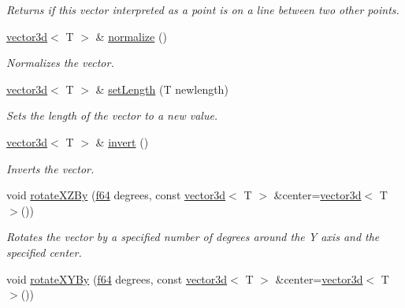 \begin{DoxyCompactItemize}
\begin{DoxyCompactList}\small\item\em Returns if this vector interpreted as a point is on a line between two other points. \end{DoxyCompactList}\item 
\hyperlink{classirr_1_1core_1_1vector3d}{vector3d}$<$ T $>$ \& \hyperlink{classirr_1_1core_1_1vector3d_a84a1861464ef70e6965c146732103c09}{normalize} ()
\begin{DoxyCompactList}\small\item\em Normalizes the vector. \end{DoxyCompactList}\item 
\mbox{\label{classirr_1_1core_1_1vector3d_ae593448ac63803b3d254b0e6c7600f28}} 
\hyperlink{classirr_1_1core_1_1vector3d}{vector3d}$<$ T $>$ \& \hyperlink{classirr_1_1core_1_1vector3d_ae593448ac63803b3d254b0e6c7600f28}{set\+Length} (T newlength)
\begin{DoxyCompactList}\small\item\em Sets the length of the vector to a new value. \end{DoxyCompactList}\item 
\mbox{\label{classirr_1_1core_1_1vector3d_a55a10e03bc09f87b95fc81ea0d508722}} 
\hyperlink{classirr_1_1core_1_1vector3d}{vector3d}$<$ T $>$ \& \hyperlink{classirr_1_1core_1_1vector3d_a55a10e03bc09f87b95fc81ea0d508722}{invert} ()
\begin{DoxyCompactList}\small\item\em Inverts the vector. \end{DoxyCompactList}\item 
void \hyperlink{classirr_1_1core_1_1vector3d_a621fbddb42814edd3d14410252cf7b7a}{rotate\+X\+Z\+By} (\hyperlink{namespaceirr_a1325b02603ad449f92c68fc640af9b28}{f64} degrees, const \hyperlink{classirr_1_1core_1_1vector3d}{vector3d}$<$ T $>$ \&center=\hyperlink{classirr_1_1core_1_1vector3d}{vector3d}$<$ T $>$())
\begin{DoxyCompactList}\small\item\em Rotates the vector by a specified number of degrees around the Y axis and the specified center. \end{DoxyCompactList}\item 
void \hyperlink{classirr_1_1core_1_1vector3d_ac38b75735ec06716305fbb09ec71784d}{rotate\+X\+Y\+By} (\hyperlink{namespaceirr_a1325b02603ad449f92c68fc640af9b28}{f64} degrees, const \hyperlink{classirr_1_1core_1_1vector3d}{vector3d}$<$ T $>$ \&center=\hyperlink{classirr_1_1core_1_1vector3d}{vector3d}$<$ T $>$())

\end{DoxyCompactItemize}
